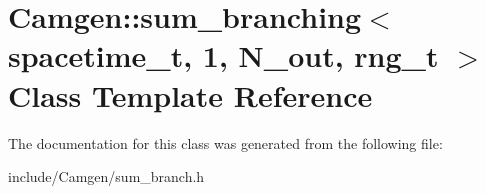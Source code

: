 \hypertarget{a00514}{\section{Camgen\-:\-:sum\-\_\-branching$<$ spacetime\-\_\-t, 1, N\-\_\-out, rng\-\_\-t $>$ Class Template Reference}
\label{a00514}
}


The documentation for this class was generated from the following file\-:\begin{DoxyCompactItemize}
\item 
include/\-Camgen/sum\-\_\-branch.\-h\end{DoxyCompactItemize}
